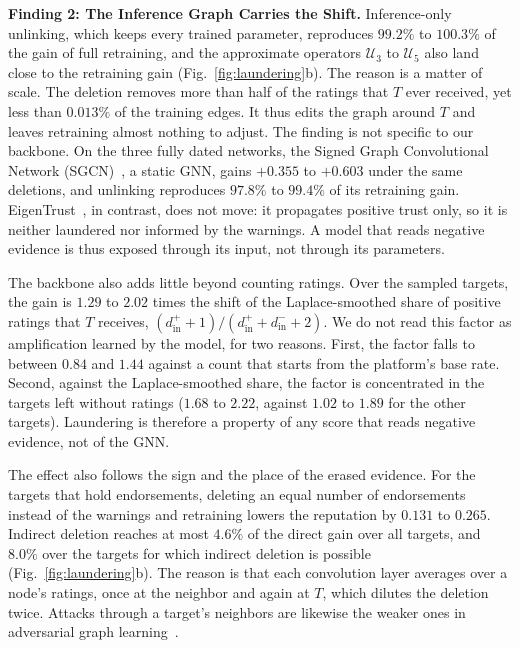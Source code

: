 \documentclass[lettersize,journal]{IEEEtran}
\begin{document}
\smallskip\noindent\textbf{Finding 2: The Inference Graph Carries the Shift.}
Inference-only unlinking, which keeps every trained parameter, reproduces $99.2\%$ to $100.3\%$ of the gain of full retraining, and the approximate operators $\mathcal{U}_3$ to $\mathcal{U}_5$ also land close to the retraining gain (Fig.~\ref{fig:laundering}b).
The reason is a matter of scale. The deletion removes more than half of the ratings that $T$ ever received, yet less than $0.013\%$ of the training edges. It thus edits the graph around $T$ and leaves retraining almost nothing to adjust.
The finding is not specific to our backbone.
On the three fully dated networks, the Signed Graph Convolutional Network (SGCN)~\cite{derr2018signed}, a static GNN, gains $+0.355$ to $+0.603$ under the same deletions, and unlinking reproduces $97.8\%$ to $99.4\%$ of its retraining gain. EigenTrust~\cite{kamvar2003eigentrust}, in contrast, does not move: it propagates positive trust only, so it is neither laundered nor informed by the warnings.
A model that reads negative evidence is thus exposed through its input, not through its parameters.

The backbone also adds little beyond counting ratings.
Over the sampled targets, the gain is $1.29$ to $2.02$ times the shift of the Laplace-smoothed share of positive ratings that $T$ receives, $(d^+_{\mathrm{in}} + 1)/(d^+_{\mathrm{in}} + d^-_{\mathrm{in}} + 2)$. We do not read this factor as amplification learned by the model, for two reasons.
First, the factor falls to between $0.84$ and $1.44$ against a count that starts from the platform's base rate. Second, against the Laplace-smoothed share, the factor is concentrated in the targets left without ratings ($1.68$ to $2.22$, against $1.02$ to $1.89$ for the other targets).
Laundering is therefore a property of any score that reads negative evidence, not of the GNN.

The effect also follows the sign and the place of the erased evidence.
For the targets that hold endorsements, deleting an equal number of endorsements instead of the warnings and retraining lowers the reputation by $0.131$ to $0.265$.
Indirect deletion reaches at most $4.6\%$ of the direct gain over all targets, and $8.0\%$ over the targets for which indirect deletion is possible (Fig.~\ref{fig:laundering}b).
The reason is that each convolution layer averages over a node's ratings, once at the neighbor and again at $T$, which dilutes the deletion twice. Attacks through a target's neighbors are likewise the weaker ones in adversarial graph learning~\cite{zugner2018adversarial}.
\end{document}
